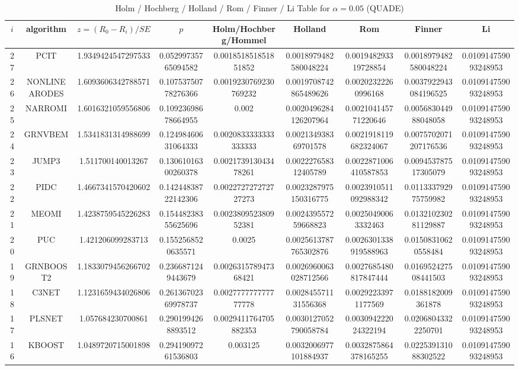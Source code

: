 \documentclass[a4paper,10pt]{article}
\begin{document}
\begin{landscape}
\begin{table}[!htp]
\centering\scriptsize
\caption{Holm / Hochberg / Holland / Rom / Finner / Li Table for $\alpha=0.05$ (QUADE)}
\begin{tabular}{ccccccccc}
$i$&algorithm&$z=(R_0 - R_i)/SE$&$p$&Holm/Hochberg/Hommel&Holland&Rom&Finner&Li\\
\hline
27&PCIT&1.9349424547297533&0.05299735765094582&0.001851851851851852&0.0018979482580048224&0.001948293319728854&0.0018979482580048224&0.010914759093248953\\
26&NONLINEARODES&1.6093606342788571&0.10753750778276366&0.0019230769230769232&0.0019708742865489626&0.00202322260996168&0.0037922943084196525&0.010914759093248953\\
25&NARROMI&1.6016321059556806&0.10923698678664955&0.002&0.0020496284126207964&0.002104145771220646&0.005683044988048058&0.010914759093248953\\
24&GRNVBEM&1.5341831314988699&0.12498460631064333&0.0020833333333333333&0.002134938369701578&0.0021918119682324067&0.0075702071207176536&0.010914759093248953\\
23&JUMP3&1.511700140013267&0.13061016300260378&0.002173913043478261&0.002227658312405789&0.0022871006410587853&0.009453787517305079&0.010914759093248953\\
22&PIDC&1.4667341570420602&0.14244838722142306&0.002272727272727273&0.0023287975150316775&0.0023910511092988342&0.011333792975759982&0.010914759093248953\\
21&MEOMI&1.4238759545226283&0.15448238355625696&0.002380952380952381&0.002439557259668823&0.00250490063332463&0.013210230281129887&0.010914759093248953\\
20&PUC&1.421206099283713&0.1552568520635571&0.0025&0.0025613787765302876&0.0026301338919588963&0.01508310620558484&0.010914759093248953\\
19&GRNBOOST2&1.1833079456266702&0.2366871249443679&0.002631578947368421&0.0026960063028712566&0.0027685480817847444&0.016952427508441503&0.010914759093248953\\
18&C3NET&1.1231659434026806&0.26136702369978737&0.002777777777777778&0.002845571131556368&0.00292233971177569&0.0188182009361878&0.010914759093248953\\
17&PLSNET&1.057684230700861&0.2901994268893512&0.0029411764705882353&0.0030127052790058784&0.003094222024322194&0.02068043322250701&0.010914759093248953\\
16&KBOOST&1.0489720715001898&0.29419097261536803&0.003125&0.0032006977101884937&0.0032875864378165255&0.022539131088302522&0.010914759093248953\\

\end{tabular}
\end{table}
\end{landscape}
\end{document}
